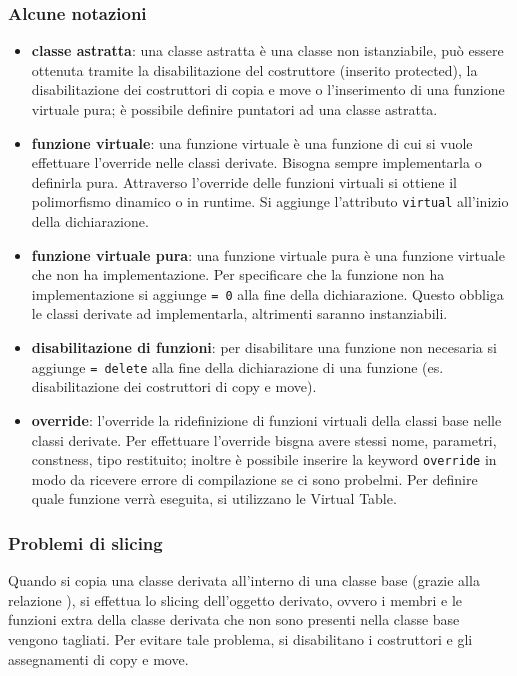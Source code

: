 \documentclass[a4paper]{article}
\begin{document}
\subsubsection*{Alcune notazioni}
\begin{itemize}
	\item \textbf{classe astratta}: una classe astratta è una classe non istanziabile, può essere ottenuta tramite la
	disabilitazione del costruttore (inserito protected), la disabilitazione dei costruttori di copia e move o l'inserimento di
	una funzione virtuale pura; è possibile definire puntatori ad una classe astratta.
	\item \textbf{funzione virtuale}: una funzione virtuale è una funzione di cui si vuole effettuare l'override nelle classi
	derivate. Bisogna sempre implementarla o definirla pura. Attraverso l'override delle funzioni virtuali si ottiene il
	polimorfismo dinamico o in runtime. Si aggiunge l'attributo \verb|virtual| all'inizio della dichiarazione.
	\item \textbf{funzione virtuale pura}: una funzione virtuale pura è una funzione virtuale che non ha implementazione. Per
	specificare che la funzione non ha implementazione si aggiunge \verb|= 0| alla fine della dichiarazione. Questo obbliga le
	classi derivate ad implementarla, altrimenti saranno instanziabili.
	\item \textbf{disabilitazione di funzioni}: per disabilitare una funzione non necesaria si aggiunge \verb|= delete| alla fine
	della dichiarazione di una funzione (es. disabilitazione dei costruttori di copy e move).
	\item \textbf{override}: l'override la ridefinizione di funzioni virtuali della classi base nelle classi derivate. Per
	effettuare l'override bisgna avere stessi nome, parametri, constness, tipo restituito; inoltre è possibile inserire la keyword
	\verb|override| in modo da ricevere errore di compilazione se ci sono probelmi. Per definire quale funzione verrà eseguita, si
	utilizzano le Virtual Table.
\end{itemize}

\subsubsection*{Problemi di slicing}
Quando si copia una classe derivata all'interno di una classe base (grazie alla relazione ), si effettua lo slicing
dell'oggetto derivato, ovvero i membri e le funzioni extra della classe derivata che non sono presenti nella classe base vengono
tagliati. Per evitare tale problema, si disabilitano i costruttori e gli assegnamenti di copy e move.
\end{document}
